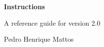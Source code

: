 \documentclass[10pt, a4paper]{article}
\begin{document}
\begin{center}
{\Huge\bfseries\normalfont Instructions}
\par
A reference guide for version 2.0
\par
Pedro Henrique Mattos
\end{center}


\tableofcontents

\clearpage






\end{document}
